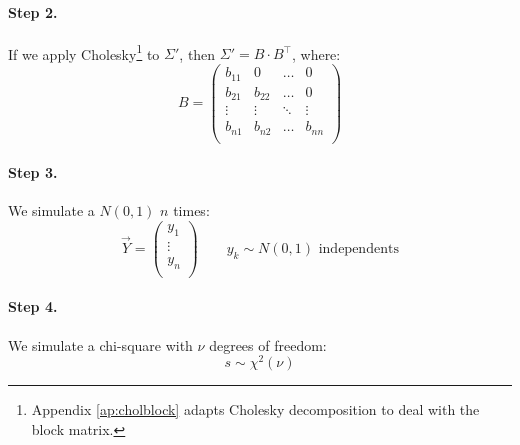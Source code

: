 \documentclass[a4paper,12pt,final]{article}
\begin{document}
\FloatBarrier

\paragraph{Step 2.} If we apply Cholesky\footnote{Appendix \ref{ap:cholblock} adapts Cholesky 
decomposition to deal with the block matrix.} to $\Sigma'$, then $\Sigma' = B \cdot B^{\top}$, 
where:
\begin{displaymath}
B = 
\left(
\begin{array}{cccc}
b_{11}   & 0        & \ldots & 0       \\
b_{21}   & b_{22}   & \ldots & 0       \\
\vdots  & \vdots  & \ddots & \vdots    \\
b_{n1}   & b_{n2}   & \ldots & b_{nn}  \\
\end{array}
\right)
\end{displaymath}

\paragraph{Step 3.} We simulate a $N(0,1)$ $n$ times:
\begin{displaymath}
\vec{Y} =
\left(
\begin{array}{c}
y_1    \\
\vdots \\
y_n    \\
\end{array}
\right) 
\qquad y_k \sim N(0,1) \textrm{ independents}
\end{displaymath}

\paragraph{Step 4.} We simulate a chi-square with $\nu$ degrees of freedom:
\begin{displaymath}
s \sim \chi^2(\nu)
\end{displaymath}
\end{document}
